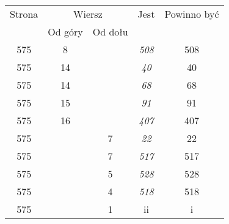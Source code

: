 \documentclass[a4paper,11pt]{article}
\begin{document}
\begin{center}
  \begin{tabular}{|c|c|c|c|c|}
    \hline
    Strona & \multicolumn{2}{c|}{Wiersz} & Jest
    & Powinno być \\ \cline{2-3}
    & Od góry & Od dołu & & \\
    \hline
    575 &  8 & & \textit{508} & 508 \\
    575 & 14 & & \textit{40} & 40 \\
    575 & 14 & & \textit{68} & 68 \\
    575 & 15 & & \textit{91} & 91 \\
    575 & 16 & & \textit{407} & 407 \\
    575 & &  7 & \textit{22} & 22 \\
    575 & &  7 & \textit{517} & 517 \\
    575 & &  5 & \textit{528} & 528 \\
    575 & &  4 & \textit{518} & 518 \\
    575 & &  1 & ii & i \\

\end{tabular}
\end{center}
\end{document}
